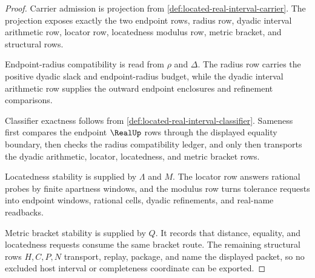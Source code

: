 \begin{proof}
Carrier admission is projection from \autoref{def:located-real-interval-carrier}. The projection exposes exactly the two endpoint rows, radius row, dyadic interval arithmetic row, locator row, locatedness modulus row, metric bracket, and structural rows.

Endpoint-radius compatibility is read from $\rho$ and $\Delta$. The radius row carries the positive dyadic slack and endpoint-radius budget, while the dyadic interval arithmetic row supplies the outward endpoint enclosures and refinement comparisons.

Classifier exactness follows from \autoref{def:located-real-interval-classifier}. Sameness first compares the endpoint $\RealUp$ rows through the displayed equality boundary, then checks the radius compatibility ledger, and only then transports the dyadic arithmetic, locator, locatedness, and metric bracket rows.

Locatedness stability is supplied by $\Lambda$ and $M$. The locator row answers rational probes by finite apartness windows, and the modulus row turns tolerance requests into endpoint windows, rational cells, dyadic refinements, and real-name readbacks.

Metric bracket stability is supplied by $Q$. It records that distance, equality, and locatedness requests consume the same bracket route. The remaining structural rows $H,C,P,N$ transport, replay, package, and name the displayed packet, so no excluded host interval or completeness coordinate can be exported.
\end{proof}

